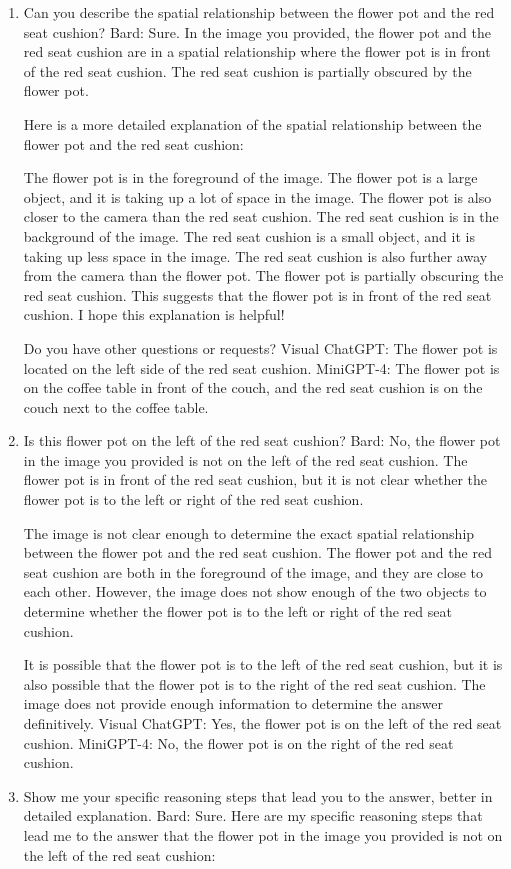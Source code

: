 \begin{enumerate}
    \item Can you describe the spatial relationship between the flower pot and the red seat cushion?
    \subitem Bard: 
    Sure. In the image you provided, the flower pot and the red seat cushion are in a spatial relationship where the flower pot is in front of the red seat cushion. The red seat cushion is partially obscured by the flower pot.
    
    Here is a more detailed explanation of the spatial relationship between the flower pot and the red seat cushion:
    
    The flower pot is in the foreground of the image. The flower pot is a large object, and it is taking up a lot of space in the image. The flower pot is also closer to the camera than the red seat cushion.
    The red seat cushion is in the background of the image. The red seat cushion is a small object, and it is taking up less space in the image. The red seat cushion is also further away from the camera than the flower pot.
    The flower pot is partially obscuring the red seat cushion. This suggests that the flower pot is in front of the red seat cushion.
    I hope this explanation is helpful!
    
    Do you have other questions or requests?
    \subitem Visual ChatGPT: The flower pot is located on the left side of the red seat cushion.
    \subitem MiniGPT-4: The flower pot is on the coffee table in front of the couch, and the red seat cushion is on the couch next to the coffee table.
    \item Is this flower pot on the left of the red seat cushion?
    \subitem Bard: 
    No, the flower pot in the image you provided is not on the left of the red seat cushion. The flower pot is in front of the red seat cushion, but it is not clear whether the flower pot is to the left or right of the red seat cushion.
    
    The image is not clear enough to determine the exact spatial relationship between the flower pot and the red seat cushion. The flower pot and the red seat cushion are both in the foreground of the image, and they are close to each other. However, the image does not show enough of the two objects to determine whether the flower pot is to the left or right of the red seat cushion.
    
    It is possible that the flower pot is to the left of the red seat cushion, but it is also possible that the flower pot is to the right of the red seat cushion. The image does not provide enough information to determine the answer definitively.
    \subitem Visual ChatGPT: Yes, the flower pot is on the left of the red seat cushion.
    \subitem MiniGPT-4: No, the flower pot is on the right of the red seat cushion.
    \item Show me your specific reasoning steps that lead you to the answer, better in detailed explanation.
    \subitem Bard: Sure. Here are my specific reasoning steps that lead me to the answer that the flower pot in the image you provided is not on the left of the red seat cushion:


\end{enumerate}
